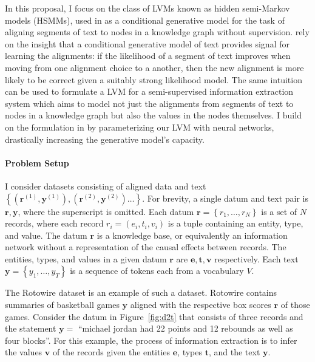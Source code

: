 \documentclass[12pt]{article}
\newcommand\set[1]{\left\{#1\right\}}
\newcommand{\be}{\mathbf{e}}
\newcommand{\br}{\mathbf{r}}
\newcommand{\bt}{\mathbf{t}}
\newcommand{\bv}{\mathbf{v}}
\newcommand{\by}{\mathbf{y}}
\begin{document}
In this proposal, I focus on the class of LVMs known as hidden semi-Markov models (HSMMs),
used in \citet{liang2009semalign} as a conditional generative model for the
task of aligning segments of text to nodes in a knowledge graph without supervision.
\citet{liang2009semalign} rely on the insight that a conditional generative model of text
provides signal for learning the alignments:
if the likelihood of a segment of text improves when moving from
one alignment choice to a another,
then the new alignment is more likely to be correct given a suitably strong likelihood model.
The same intuition can be used to formulate a LVM for a semi-supervised information extraction system
which aims to model not just the alignments from segments of text to nodes in a knowledge graph
but also the values in the nodes themselves.
I build on the formulation in \citet{liang2009semalign} by parameterizing our LVM
with neural networks, drastically increasing the generative model's capacity.

\paragraph{Problem Setup}
I consider datasets consisting of aligned data and text
$\set{(\br^{(1)}, \by^{(1)}),(\br^{(2)},\by^{(2)})\ldots}$.
For brevity, a single datum and text pair is $\br,\by$, where the superscript is omitted.
Each datum $\br = \set{r_1,\ldots,r_N}$ is a set of $N$ records, where each record $r_i = (e_i, t_i, v_i)$
is a tuple containing an entity, type, and value.
The datum $\br$ is a knowledge base, or equivalently an information network
without a representation of the causal effects between records.
The entities, types, and values in a given datum $\br$ are $\be,\bt,\bv$ respectively.
Each text $\by = \set{y_1,\ldots,y_T}$ is a sequence of tokens each from a vocabulary $V$.

The Rotowire dataset \citep{wiseman2017d2t} is an example of such a dataset.
Rotowire contains summaries of basketball games $\by$ aligned with the respective
box scores $\br$ of those games.
Consider the datum in Figure~\ref{fig:d2t} that consists of three records
and the statement $\by = $ ``michael jordan had 22 points and 12 rebounds as well as four blocks''.
For this example, the process of information extraction is to infer 
the values $\bv$ of the records given the entities $\be$, types $\bt$, and the text $\by$.
\end{document}
